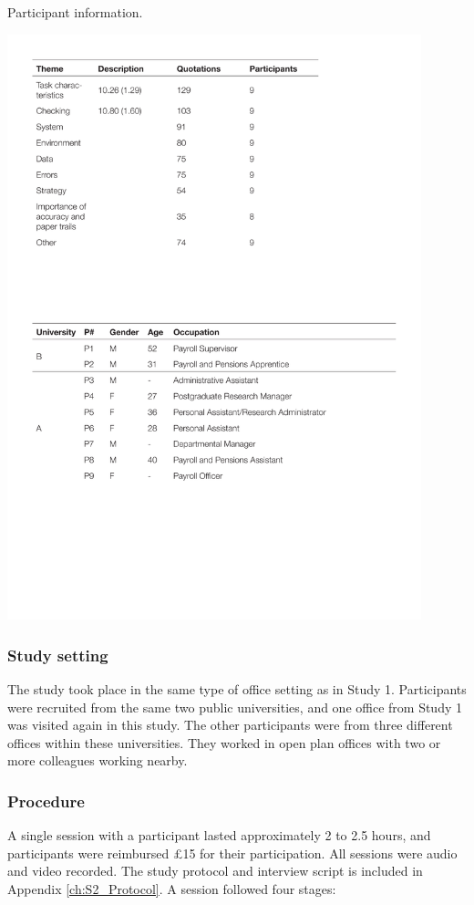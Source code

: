 \begin{table}
\caption[Study 2 participant information]{Participant information.}
\centering
\includegraphics[width=0.9\textwidth]{images/ch12/ch12_participants2.pdf}
\vspace{-3pt}
\label{tbl:ch12-part2}
\end{table}

\subsubsection{Study setting}
The study took place in the same type of office setting as in Study 1. Participants were recruited from the same two public universities, and one office from Study 1 was visited again in this study. The other participants were from three different offices within these universities. They worked in open plan offices with two or more colleagues working nearby. 

\subsubsection{Procedure}
A single session with a participant lasted approximately 2 to 2.5 hours, and participants were reimbursed \pounds 15 for their participation. All sessions were audio and video recorded. The study protocol and interview script is included in Appendix \ref{ch:S2_Protocol}. A session followed four stages:

